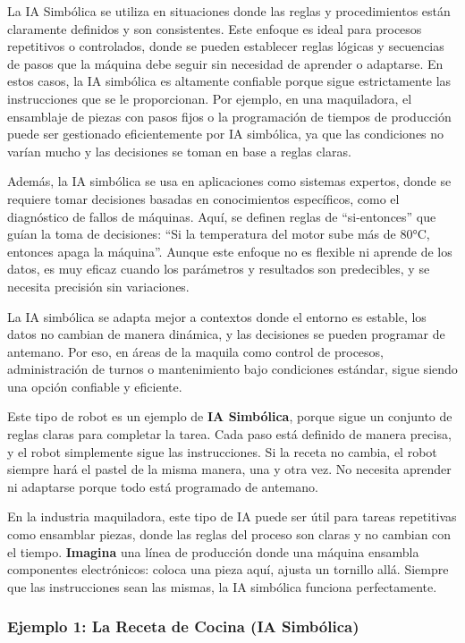 \documentclass[
  10pt,
  letterpaper,
]{book}
\begin{document}
La IA Simbólica se utiliza en situaciones donde las reglas y
procedimientos están claramente definidos y son consistentes. Este
enfoque es ideal para procesos repetitivos o controlados, donde se
pueden establecer reglas lógicas y secuencias de pasos que la máquina
debe seguir sin necesidad de aprender o adaptarse. En estos casos, la IA
simbólica es altamente confiable porque sigue estrictamente las
instrucciones que se le proporcionan. Por ejemplo, en una maquiladora,
el ensamblaje de piezas con pasos fijos o la programación de tiempos de
producción puede ser gestionado eficientemente por IA simbólica, ya que
las condiciones no varían mucho y las decisiones se toman en base a
reglas claras.

Además, la IA simbólica se usa en aplicaciones como sistemas expertos,
donde se requiere tomar decisiones basadas en conocimientos específicos,
como el diagnóstico de fallos de máquinas. Aquí, se definen reglas de
``si-entonces'' que guían la toma de decisiones: ``Si la temperatura del
motor sube más de 80°C, entonces apaga la máquina''. Aunque este enfoque
no es flexible ni aprende de los datos, es muy eficaz cuando los
parámetros y resultados son predecibles, y se necesita precisión sin
variaciones.

La IA simbólica se adapta mejor a contextos donde el entorno es estable,
los datos no cambian de manera dinámica, y las decisiones se pueden
programar de antemano. Por eso, en áreas de la maquila como control de
procesos, administración de turnos o mantenimiento bajo condiciones
estándar, sigue siendo una opción confiable y eficiente.

Este tipo de robot es un ejemplo de \textbf{IA Simbólica}, porque sigue
un conjunto de reglas claras para completar la tarea. Cada paso está
definido de manera precisa, y el robot simplemente sigue las
instrucciones. Si la receta no cambia, el robot siempre hará el pastel
de la misma manera, una y otra vez. No necesita aprender ni adaptarse
porque todo está programado de antemano.

En la industria maquiladora, este tipo de IA puede ser útil para tareas
repetitivas como ensamblar piezas, donde las reglas del proceso son
claras y no cambian con el tiempo. \textbf{Imagina} una línea de
producción donde una máquina ensambla componentes electrónicos: coloca
una pieza aquí, ajusta un tornillo allá. Siempre que las instrucciones
sean las mismas, la IA simbólica funciona perfectamente.

\subsubsection{Ejemplo 1: La Receta de Cocina (IA
Simbólica)}\label{ejemplo-1-la-receta-de-cocina-ia-simbuxf3lica}
\end{document}
